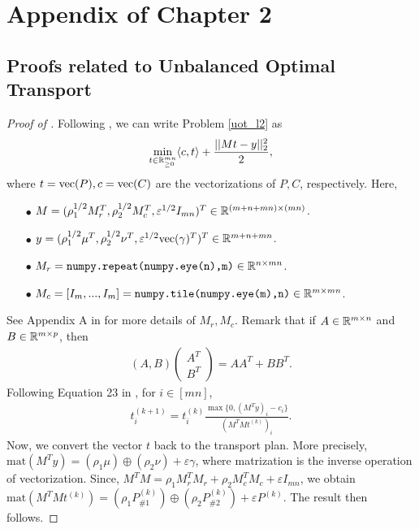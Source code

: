 \section{Appendix of Chapter 2}

\subsection{Proofs related to Unbalanced Optimal Transport}

\begin{proof}[Proof of ]
Following \citep{Chapel21}, we can write Problem \eqref{uot_l2} as
\begin{align}
    \min_{t \in \mathbb R^{mn}_{\geq 0}} \langle c, t \rangle + \frac{|| Mt - y ||_2^2}{2},
\end{align}
where $t = \text{vec}(P), c = \text{vec}(C)$ are the vectorizations of $P, C$, respectively. Here,
\begin{itemize}
    \item[$\bullet$] $M = (\rho_1^{1/2} M_r^T, \rho_2^{1/2} M_c^T, \varepsilon^{1/2} I_{mn})^T \in \mathbb R^{(m + n + mn) \times (mn)}$.

    \item[$\bullet$] $y = (\rho_1^{1/2} \mu^T, \rho_2^{1/2} \nu^T, \varepsilon^{1/2} \text{vec}(\gamma)^T)^T \in \mathbb R^{m + n + mn}$.

    \item[$\bullet$] $M_r = \texttt{numpy.repeat(numpy.eye(n),m)} \in \mathbb R^{n \times mn}$.

    \item[$\bullet$] $M_c = [I_m, ..., I_m] = \texttt{numpy.tile(numpy.eye(m),n)} \in \mathbb R^{m \times mn}$.
\end{itemize}
See Appendix A in \citep{Chapel21} for more details of $M_r, M_c$.
Remark that if $A \in \mathbb R^{m \times n}$ and $B \in \mathbb R^{m \times p}$, then
\begin{align}
    (A, B) \begin{pmatrix}
        A^T \\
        B^T
    \end{pmatrix}
    = A A^T + B B^T.
\end{align}
Following Equation 23 in \citep{Chapel21}, for $i \in [mn]$,
\begin{align}
    t^{(k+1)}_i = t^{(k)}_i \frac{\max \big\{ 0, (M^T y)_i - c_i \big\}}{(M^T M t^{(k)})_i}.
\end{align}
Now, we convert the vector $t$ back to the transport plan. More precisely,
$\text{mat}(M^T y) = (\rho_1 \mu) \oplus (\rho_2 \nu) + \varepsilon \gamma$,
where matrization is the inverse operation of vectorization. Since,
$M^T M = \rho_1 M_r^T M_r + \rho_2 M_c^T M_c + \varepsilon I_{mn}$, we obtain
$\text{mat}(M^T M t^{(k)}) = (\rho_1 P_{\# 1}^{(k)}) \oplus (\rho_2 P_{\# 2}^{(k)})
+ \varepsilon P^{(k)} $. The result then follows.
\end{proof}

